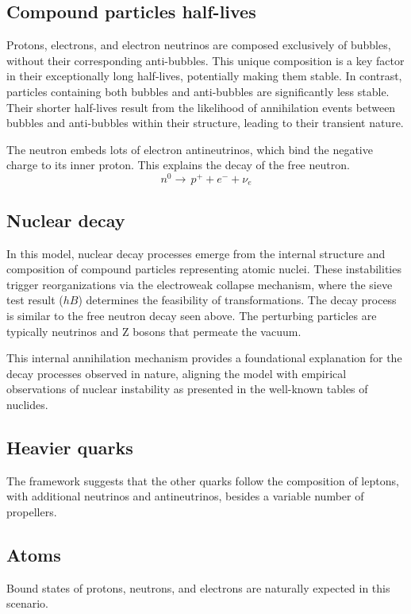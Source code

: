 \documentclass[12pt]{article}
\begin{document}
\subsection{Compound particles half-lives}
Protons, electrons, and electron neutrinos are composed exclusively of bubbles, without their corresponding anti-bubbles. This unique composition is a key factor in their exceptionally long half-lives, potentially making them stable. In contrast, particles containing both bubbles and anti-bubbles are significantly less stable. Their shorter half-lives result from the likelihood of annihilation events between bubbles and anti-bubbles within their structure, leading to their transient nature.

The neutron embeds lots of electron antineutrinos, which bind the negative charge to its inner proton. This explains the decay of the free neutron.
\[
n^0\rightarrow\,p^{+}+e^{-}+\nu_e
\]

\subsection{Nuclear decay}

In this model, nuclear decay processes emerge from the internal structure and composition of compound particles representing atomic nuclei. These instabilities trigger reorganizations via the electroweak collapse mechanism, where the sieve test result ($hB$) determines the feasibility of transformations. The decay process is similar to the free neutron decay seen above. The perturbing particles are typically neutrinos and Z bosons that permeate the vacuum.

This internal annihilation mechanism provides a foundational explanation for the decay processes observed in nature, aligning the model with empirical observations of nuclear instability as presented in the well-known tables of nuclides.

\subsection{Heavier quarks}
The framework suggests that the other quarks follow the composition of leptons, with additional neutrinos and antineutrinos, besides a variable number of propellers.

\subsection{Atoms}
Bound states of protons, neutrons, and electrons are naturally expected in this scenario.
\end{document}
